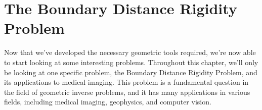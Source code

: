 \chapter{The Boundary Distance Rigidity Problem}
\label{chap:2}

Now that we've developed the necessary geometric tools required, we're now able to start looking at some interesting problems. Throughout this chapter, we'll only be looking at one specific problem, the Boundary Distance Rigidity Problem, and its applications to medical imaging. This problem is a fundamental question in the field of geometric inverse problems, and it has many applications in various fields, including medical imaging, geophysics, and computer vision.




% 


